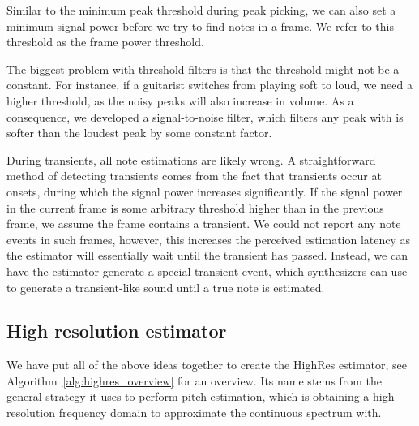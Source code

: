 \documentclass[a4paper,10pt,twocolumn]{article}
\begin{document}
Similar to the minimum peak threshold during peak picking, we can also set a minimum signal power before we try to find notes in a frame. We refer to this threshold as the frame power threshold.

The biggest problem with threshold filters is that the threshold might not be a constant. For instance, if a guitarist switches from playing soft to loud, we need a higher threshold, as the noisy peaks will also increase in volume. As a consequence, we developed a signal-to-noise filter, which filters any peak with is softer than the loudest peak by some constant factor.

During transients, all note estimations are likely wrong. A straightforward method of detecting transients comes from the fact that transients occur at onsets, during which the signal power increases significantly. If the signal power in the current frame is some arbitrary threshold higher than in the previous frame, we assume the frame contains a transient. We could not report any note events in such frames, however, this increases the perceived estimation latency as the estimator will essentially wait until the transient has passed. Instead, we can have the estimator generate a special transient event, which synthesizers can use to generate a transient-like sound until a true note is estimated.


\subsection{High resolution estimator}  \label{sec:highrespitch}
We have put all of the above ideas together to create the HighRes estimator, see Algorithm~\ref{alg:highres_overview} for an overview. Its name stems from the general strategy it uses to perform pitch estimation, which is obtaining a high resolution frequency domain to approximate the continuous spectrum with.
\end{document}
